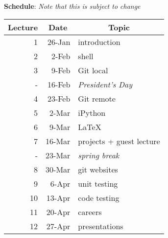 \documentclass[12pt]{article}
\begin{document}
\clearpage
\noindent\textbf{Schedule}: \textit{Note that this is subject to change}\\
\begin{table}[htbp]
\begin{tabular}{|r|r|l|}
\hline
\multicolumn{1}{|c|}{Lecture} & \multicolumn{1}{c|}{Date} & \multicolumn{1}{c|}{Topic} \\ \hline
1 & 26-Jan & introduction \\ \hline
2 & 2-Feb & shell \\ \hline
3 & 9-Feb & Git local \\ \hline
- & 16-Feb & \textit{President's Day} \\ \hline
4 & 23-Feb & Git remote \\ \hline
5 & 2-Mar & iPython \\ \hline
6 & 9-Mar & \LaTeX \\ \hline
7 & 16-Mar & projects + guest lecture\\ \hline
- & 23-Mar & \textit{spring break} \\ \hline
8 & 30-Mar & git websites \\ \hline
9 & 6-Apr & unit testing \\ \hline
10 & 13-Apr & code testing \\ \hline
11 & 20-Apr & careers \\ \hline
12 & 27-Apr & presentations \\ \hline
\end{tabular}
\end{table}
\end{document}
